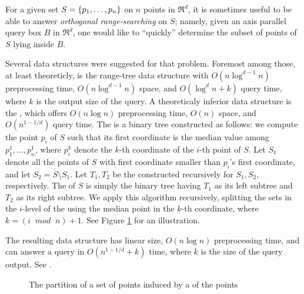 
For a given set $S = \left\{ { p_1, \ldots, p_n } \right\}$ on $n$ points in
$\Re^d$, it is sometimes useful to be able to answer {\em orthogonal
   range-searching} on $S$; namely, given an axis parallel query box
$B$ in $\Re^d$, one would like to ``quickly'' determine the subset of
points of $S$ lying inside $B$.





Several data structures were suggested for that problem. 
Foremost among those, at least theoreticly, is the range-tree data structure
with $O(n \log^{d-1} n)$ preprocessing time, $O(n\log^{d-1} n)$ space,
and $O(\log^{d} n + k)$ query time, where $k$ is the output size of
the query.
A theoreticaly inferior data structure is the \kdt, which offers $O(n
\log{n})$ preprocessing time, $O(n)$ space, and $O(n^{1-1/d})$ query
time. The {\kdt}  is a binary tree constructed as follows: we compute
the point $p_i$ of $S$ such that its first coordinate is the median
value among $p_1^1, \ldots, p_n^1$, where $p_i^k$ denote the $k$-th
coordinate of the $i$-th point of $S$. Let $S_1$ denote all the points
of $S$ with first coordinate smaller than $p_i$'s first coordinate, and
let $S_2 = S \setminus S_1$.  Let $T_1,T_2$ be the {\kdts}  constructed
recursively for $S_1, S_2$, respectively.  The {\kdt}  of $S$ is simply
the binary tree having $T_1$ as its left subtree and $T_2$ as its
right subtree. We apply this algorithm recursively, splitting the sets
in the $i$-level of the {\kdt}  using the median point in the $k$-th
coordinate, where $k=(i \;\;mod \;\;n) + 1$. See Figure
\ref{KDT_fig:kdtree} for an illustration.

The resulting data structure has linear size, $O(n\log{n})$
preprocessing time, and can answer a query in $O(n^{1-1/d} +k)$ time,
where $k$ is the size of the query output. See \cite{bkos-cgaa-97}.

\begin{ccTexOnly}

\begin{figure}[hb]
    \begin{center}
    \end{center}

    \caption{The partition of a set of  points induced by a  
       {\kdt}  of the points}

    \label{KDT_fig:kdtree}
\end{figure}

\end{ccTexOnly}

